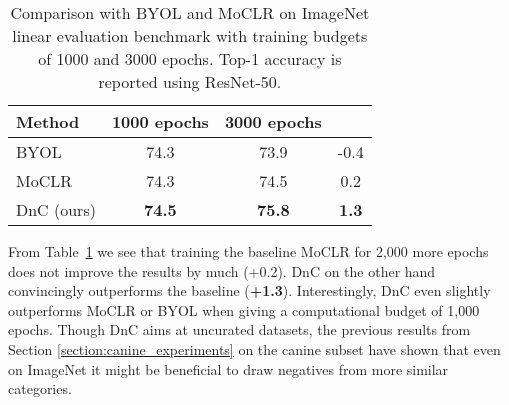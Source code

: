 \documentclass[final]{cvpr}
\newcommand\showdiff[1]{\textbf{\textcolor{nicergreen}{#1}}}
\newcommand\baseline{MoCLR}
\begin{document}
\begin{table}[h]
\caption{Comparison with BYOL and MoCLR on ImageNet linear evaluation benchmark with training budgets of 1000 and 3000 epochs. Top-1 accuracy is reported using ResNet-50.
}
\vspace{-4pt}
\label{tab:imagenet_results}
\begin{center}
\begin{small}
\begin{tabular}{lccc}
\toprule

Method & 1000 epochs & 3000 epochs &  \\
\midrule
BYOL        & 74.3 & 73.9 & -0.4 \\
MoCLR       & 74.3 & 74.5 & 0.2  \\
DnC (ours)  & \cellcolor{DnCBG}\textbf{74.5} & \cellcolor{DnCBG}\textbf{75.8} & \cellcolor{DnCBG}\textbf{1.3}  \\
\bottomrule

\end{tabular}
\end{small}
\end{center}
\vspace{-15pt}
\end{table} 
From Table~\ref{tab:imagenet_results} we see that training the baseline \baseline{} for 2,000 more epochs does not improve the results by much (+0.2). DnC on the other hand convincingly outperforms the baseline (\showdiff{+1.3}). Interestingly, DnC even slightly outperforms \baseline{} or BYOL when giving a computational budget of 1,000 epochs. Though DnC aims at uncurated datasets, the previous results from Section \ref{section:canine_experiments} on the canine subset have shown that even on ImageNet it might be beneficial to draw negatives from more similar categories.
\end{document}

